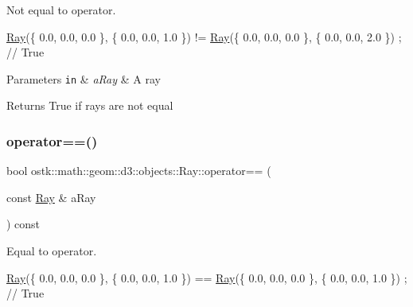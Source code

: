 Not equal to operator. 


\begin{DoxyCode}
\hyperlink{classostk_1_1math_1_1geom_1_1d3_1_1objects_1_1_ray_a78335698f8a4f72e613e607b13121df0}{Ray}(\{ 0.0, 0.0, 0.0 \}, \{ 0.0, 0.0, 1.0 \}) != \hyperlink{classostk_1_1math_1_1geom_1_1d3_1_1objects_1_1_ray_a78335698f8a4f72e613e607b13121df0}{Ray}(\{ 0.0, 0.0, 0.0 \}, \{ 0.0, 0.0, 2.0 \}) ; \textcolor{comment}{// True}
\end{DoxyCode}



\begin{DoxyParams}[1]{Parameters}
\mbox{\tt in}  & {\em a\+Ray} & A ray \\
\hline
\end{DoxyParams}
\begin{DoxyReturn}{Returns}
True if rays are not equal 
\end{DoxyReturn}
\mbox{\label{classostk_1_1math_1_1geom_1_1d3_1_1objects_1_1_ray_ad261573a0f3538dae39cd28c7d9a7dd2}} 
\subsubsection{\texorpdfstring{operator==()}{operator==()}}
{\footnotesize\ttfamily bool ostk\+::math\+::geom\+::d3\+::objects\+::\+Ray\+::operator== (\begin{DoxyParamCaption}\item[{const \hyperlink{classostk_1_1math_1_1geom_1_1d3_1_1objects_1_1_ray}{Ray} \&}]{a\+Ray }\end{DoxyParamCaption}) const}



Equal to operator. 


\begin{DoxyCode}
\hyperlink{classostk_1_1math_1_1geom_1_1d3_1_1objects_1_1_ray_a78335698f8a4f72e613e607b13121df0}{Ray}(\{ 0.0, 0.0, 0.0 \}, \{ 0.0, 0.0, 1.0 \}) == \hyperlink{classostk_1_1math_1_1geom_1_1d3_1_1objects_1_1_ray_a78335698f8a4f72e613e607b13121df0}{Ray}(\{ 0.0, 0.0, 0.0 \}, \{ 0.0, 0.0, 1.0 \}) ; \textcolor{comment}{// True}
\end{DoxyCode}



